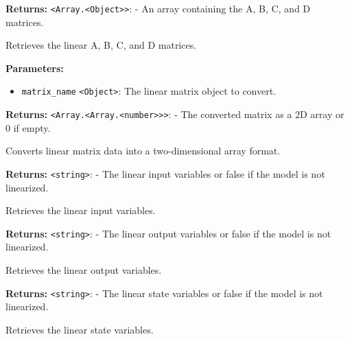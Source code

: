 \documentclass[12pt,a4paper]{article}
\begin{document}
\noindent \textbf{Returns:} \texttt{<Array.<Object>>}: - An array containing the A, B, C, and D matrices.

\noindent Retrieves the linear A, B, C, and D matrices.

\vspace{5mm}
\noindent {}


\noindent \textbf{Parameters:}
\begin{itemize}
  \item \texttt{matrix\_name} \texttt{<Object>}: The linear matrix object to convert.
\end{itemize}

\noindent \textbf{Returns:} \texttt{<Array.<Array.<number>>>}: - The converted matrix as a 2D array or 0 if empty.

\noindent Converts linear matrix data into a two-dimensional array format.

\vspace{5mm}
\noindent {}


\noindent \textbf{Returns:} \texttt{<string>}: - The linear input variables or false if the model is not linearized.

\noindent Retrieves the linear input variables.

\vspace{5mm}
\noindent {}


\noindent \textbf{Returns:} \texttt{<string>}: - The linear output variables or false if the model is not linearized.

\noindent Retrieves the linear output variables.

\vspace{5mm}
\noindent {}


\noindent \textbf{Returns:} \texttt{<string>}: - The linear state variables or false if the model is not linearized.

\noindent Retrieves the linear state variables.
\end{document}

